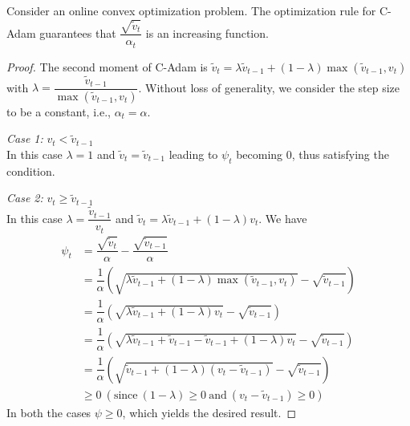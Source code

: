 \documentclass[10pt,a4paper]{amsart}
\begin{document}
\begin{lem}
    Consider an online convex optimization problem. The optimization rule for C-Adam guarantees that $ \dfrac{\sqrt{\tilde{v}_{t}}}{\alpha_{t}}$ is an increasing function.
\end{lem}

\begin{proof}
    The second moment of C-Adam is $\tilde{v}_{t} = \lambda\tilde{v}_{t-1} + (1-\lambda)\max(\tilde{v}_{t-1}, v_{t})$ with $\lambda = \dfrac{\tilde{v}_{t-1}}{\max(\tilde{v}_{t-1}, v_{t})}$. Without loss of generality, we consider the step size to be a constant, i.e., $\alpha_t = \alpha$.

    \textit{Case 1:} $v_{t} < \tilde{v}_{t-1}$\\
In this case $\lambda = 1$ and $\tilde{v}_{t} = \tilde{v}_{t-1}$ leading to $\psi_t$ becoming 0, thus satisfying the condition.

\textit{Case 2:} $v_{t} \geq \tilde{v}_{t-1}$\\
In this case $\lambda = \dfrac{\tilde{v}_{t-1}}{v_{t}}$ and $\tilde{v}_{t} = \lambda\tilde{v}_{t-1} + (1-\lambda)v_{t}$. We have
\begin{align*}
\psi_{t} &= \dfrac{\sqrt{\tilde{v}_t}}{\alpha} - \dfrac{\sqrt{\tilde{v}_{t-1}}}{\alpha}\\
         &= \dfrac{1}{\alpha}(\sqrt{\lambda\tilde{v}_{t-1} + (1-\lambda)\max(\tilde{v}_{t-1}, v_{t})} -  \sqrt{\tilde{v}_{t-1}})\\ 
         &= \dfrac{1}{\alpha}(\sqrt{\lambda\tilde{v}_{t-1} + (1-\lambda)v_{t}} -  \sqrt{\tilde{v}_{t-1}})\\
        &= \dfrac{1}{\alpha}(\sqrt{\lambda\tilde{v}_{t-1} + \tilde{v}_{t-1} - \tilde{v}_{t-1} + (1-\lambda)v_{t}} -  \sqrt{\tilde{v}_{t-1}})\\
        &= \dfrac{1}{\alpha}(\sqrt{\tilde{v}_{t-1} + (1 - \lambda)(v_{t} - \tilde{v}_{t-1})} - \sqrt{\tilde{v}_{t-1}})\\
        &\geq 0 \ (\text{since}\ (1-\lambda)\geq 0\ \text{and}\ (v_t-\tilde{v}_{t-1})\geq 0)
\end{align*}
In both the cases $\psi \geq 0$, which yields the desired result.
\end{proof}
\end{document}
